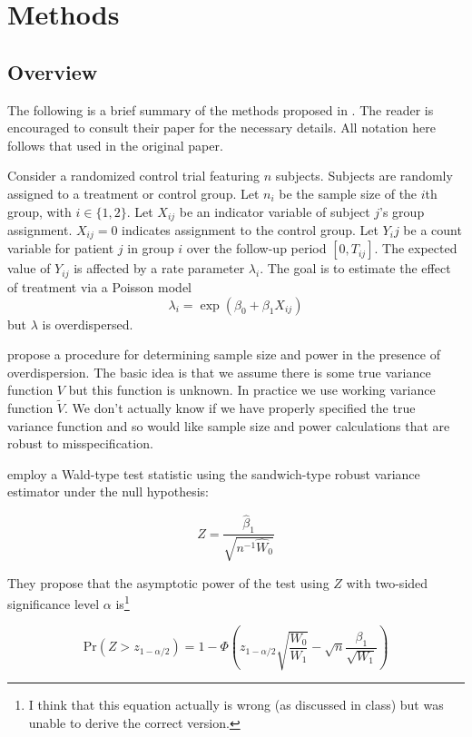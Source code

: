 \documentclass{article}
\begin{document}
\section{Methods}

\subsection{Overview}

The following is a brief summary of the methods proposed in \cite{igeta2018}.
The reader is encouraged to consult their paper for the necessary details. All
notation here follows that used in the original paper.

Consider a randomized control trial featuring $n$ subjects. 
Subjects are randomly assigned to a treatment or control group.
Let $n_i$ be the sample size of the $i$th group, with $i \in \{1, 2\}$.
Let $X_{ij}$ be an indicator variable of subject $j$'s group assignment. 
$X_{ij}=0$ indicates assignment to the control group.
Let $Y_ij$ be a count variable for patient $j$ in group $i$ over the follow-up period $[0, T_{ij}]$.
The expected value of $Y_{ij}$ is affected by a rate parameter $\lambda_i$.
The goal is to estimate the effect of treatment via a Poisson model 
$$
\lambda_i 
= \exp{(\beta_0 + \beta_1 X_{ij})}
$$
but $\lambda$ is overdispersed. 

\cite{igeta2018} propose a procedure for determining sample size and power in
the presence of overdispersion. The basic idea is that we assume there is some 
true variance function $V$ but this function is unknown. In practice we use
working variance function $\tilde{V}$. We don't actually know if we have
properly specified the true variance function and so would like sample size and power
calculations that are robust to misspecification.

\cite{igeta2018} employ a Wald-type test statistic using the sandwich-type
robust variance estimator under the null hypothesis:

\begin{equation}
	Z = \frac{\hat{\beta}_1}{\sqrt{n^{-1} \hat{W}_0}}
\end{equation}

They propose that the asymptotic power of the test using $Z$ 
with two-sided significance level $\alpha$ is\footnote{I think that 
this equation actually is wrong (as discussed in class) but was unable to derive the
correct version.}

\begin{equation}
	\mathrm{Pr} \left( Z > z_{1 - \alpha/ 2} \right) 
	=
	1 - \Phi 
	\left(
	z_{1 - \alpha / 2}
	\sqrt{\frac{W_0}{W_1}}
	-
	\sqrt{n}
	\frac{\beta_1}{\sqrt{W_1}}
	\right)
\end{equation}
\end{document}
